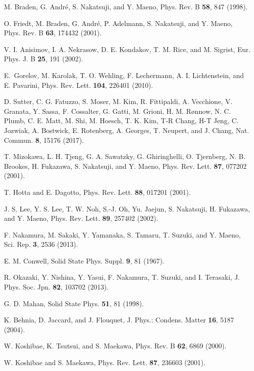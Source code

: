 \documentclass[aps,twocolumn,showpacs,preprintnumbers,amsmath,amssymb,floats,citeautoscript,nobalancelastpage]{revtex4-1}
\begin{document}
\begin{thebibliography}{99}
M. Braden, G.  Andr\'e, S. Nakatsuji,  and Y. Maeno,
Phys. Rev. B {\bf 58}, 847 (1998).

O. Friedt, M. Braden, G. Andr\'e, P. Adelmann, S. Nakatsuji,  and Y. Maeno,
Phys. Rev. B {\bf 63}, 174432 (2001).

V. I. Anisimov, I. A. Nekrasow, D. E. Kondakov, T. M. Rice, and M. Sigrist, 
Eur. Phys. J. B {\bf 25}, 191 (2002).

E.~Gorelov, M. Karolak, T. O. Wehling, F. Lechermann, A. I. Lichtenstein, and E. Pavarini,
Phys. Rev. Lett. {\bf 104}, 226401 (2010).

D. Sutter, C. G. Fatuzzo, S. Moser, M. Kim, R. Fittipaldi, A. Vecchione, V. Granata, Y. Sassa, F. Cossalter, G. Gatti, M. Grioni, H. M. R\o nnow, N. C. Plumb, C. E. Matt, M. Shi, M. Hoesch, T. K. Kim, T-R Chang, H-T Jeng, C. Jozwiak, A. Bostwick, E. Rotenberg, A. Georges, T. Neupert, and J. Chang,
Nat. Commun. {\bf 8}, 15176 (2017).

T. Mizokawa, L. H. Tjeng, G. A. Sawatzky, G. Ghiringhelli, O. Tjernberg, N. B. Brookes, H. Fukazawa, S. Nakatsuji, and Y. Maeno,
Phys. Rev. Lett. {\bf 87}, 077202 (2001).

T. Hotta and E. Dagotto, 
Phys. Rev. Lett. {\bf 88}, 017201 (2001).

J. S. Lee, Y. S. Lee, T. W. Noh, S.-J. Oh, Yu. Jaejun, S. Nakatsuji, H. Fukazawa, and Y. Maeno,
Phys. Rev. Lett. {\bf 89}, 257402 (2002).

F. Nakamura, M. Sakaki, Y. Yamanaka, S. Tamaru, T. Suzuki, and Y. Maeno,
Sci. Rep. {\bf 3}, 2536 (2013).

E. M. Conwell, 
Solid State Phys. Suppl. {\bf 9}, 81 (1967).

R. Okazaki, Y. Nishina, Y. Yasui, F. Nakamura, T. Suzuki, and I. Terasaki,
J. Phys. Soc. Jpn. {\bf 82}, 103702 (2013).

G. D. Mahan,
Solid State Phys. {\bf 51}, 81 (1998).

K. Behnia, D. Jaccard, and J. Flouquet,
J. Phys.: Condens. Matter {\bf 16}, 5187 (2004).

W. Koshibae, K. Tsutsui, and S. Maekawa,
Phys. Rev. B {\bf 62}, 6869 (2000).

W. Koshibae and S. Maekawa,
Phys. Rev. Lett. {\bf 87}, 236603 (2001).


\end{thebibliography}
\end{document}
